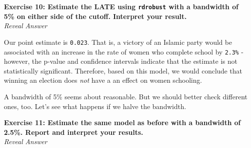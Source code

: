 \documentclass[
  letterpaper,
  DIV=11,
  numbers=noendperiod]{scrreprt}
\newenvironment{Shaded}{\begin{snugshade}}{\end{snugshade}}
\newcommand{\AttributeTok}[1]{\textcolor[rgb]{0.40,0.45,0.13}{#1}}
\newcommand{\DecValTok}[1]{\textcolor[rgb]{0.68,0.00,0.00}{#1}}
\newcommand{\FloatTok}[1]{\textcolor[rgb]{0.68,0.00,0.00}{#1}}
\newcommand{\FunctionTok}[1]{\textcolor[rgb]{0.28,0.35,0.67}{#1}}
\newcommand{\NormalTok}[1]{\textcolor[rgb]{0.00,0.23,0.31}{#1}}
\newcommand{\OtherTok}[1]{\textcolor[rgb]{0.00,0.23,0.31}{#1}}
\newcommand{\SpecialCharTok}[1]{\textcolor[rgb]{0.37,0.37,0.37}{#1}}
\begin{document}
\begin{Shaded}
\end{Shaded}

\textbf{Exercise 10: Estimate the LATE using \texttt{rdrobust} with a
bandwidth of 5\% on either side of the cutoff. Interpret your result.}\\

\emph{Reveal Answer}

\begin{Shaded}
\end{Shaded}

Our point estimate is \texttt{0.023}. That is, a victory of an Islamic
party would be associated with an increase in the rate of women who
complete school by \texttt{2.3\%} - however, the p-value and confidence
intervals indicate that the estimate is not statistically significant.
Therefore, based on this model, we would conclude that winning an
election does \emph{not} have a an effect on women schooling.

\hfill\break

A bandwidth of 5\% seems about reasonable. But we should better check
different ones, too. Let's see what happens if we halve the bandwidth.

\textbf{Exercise 11: Estimate the same model as before with a bandwidth
of 2.5\%. Report and interpret your results.}\\

\emph{Reveal Answer}

\begin{Shaded}
\end{Shaded}
\end{document}
